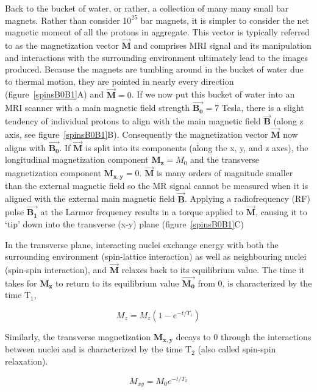 Back to the bucket of water, or rather, a collection of many many small bar magnets.
Rather than consider 1$0^{25}$ bar magnets, it is simpler to consider the net magnetic moment of all the protons in aggregate.
This vector is typically referred to as the magnetization vector $\vec{\mathbf{M}}$ and comprises MRI signal and its manipulation and interactions with the surrounding environment ultimately lead to the images produced.
Because the magnets are tumbling around in the bucket of water due to thermal motion, they are pointed in nearly every direction (figure~\ref{spinsB0B1}A) and $\vec{\mathbf{M}} = 0$.
If we now put this bucket of water into an MRI scanner with a main magnetic field strength $\vec{\mathbf{B_0}} = 7$ Tesla, there is a slight tendency of individual protons to align with the main magnetic field $\vec{\mathbf{B}}$ (along z axis, see figure~\ref{spinsB0B1}B).
Consequently the magnetization vector $\vec{\mathbf{M}}$ now aligns with $\vec{\mathbf{B_0}}$.
If $\vec{\mathbf{M}}$ is split into its components (along the x, y, and z axes), the longitudinal magnetization component $\mathbf{M_z} = M_0$ and the transverse magnetization component $\mathbf{M_{x,y}} = 0$.
$\vec{\mathbf{M}}$ is many orders of magnitude smaller than the external magnetic field so the MR signal cannot be measured when it is aligned with the external main magnetic field $\vec{\mathbf{B}}$. 
Applying a radiofrequency (RF) pulse $\vec{\mathbf{B_1}}$ at the Larmor frequency results in a torque applied to $\vec{\mathbf{M}}$, causing it to `tip' down into the transverse (x-y) plane (figure~\ref{spinsB0B1}C)

In the transverse plane, interacting nuclei exchange energy with both the surrounding environment (spin-lattice interaction) as well as neighbouring nuclei (spin-spin interaction), and $\vec{\mathbf{M}}$ relaxes back to its equilibrium value. 
The time it takes for $\mathbf{M_z}$ to return to its equilibrium value $\vec{\mathbf{M_0}}$ from 0, is characterized by the time T$_1$,

\begin{equation}
	M_z = M_z(1-e^{-t/T_1})
	\label{T1}
\end{equation}

Similarly, the transverse magnetization $\mathbf{M_{x,y}}$ decays to 0 through the interactions between nuclei and is characterized by the time T$_2$ (also called spin-spin relaxation).
		
\begin{equation}
		M_{xy} = M_0 e^{-t/T_2}
		\label{T2}
\end{equation}


